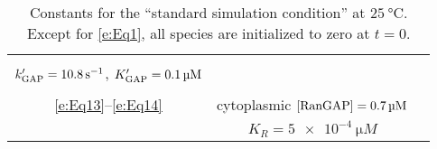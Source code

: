 \documentclass[12pt,notitlepage]{article}
\begin{document}
\begin{table}
\begin{tabular}{c|c|c}
{	}
	&
	\makecell{
		$k_{\ce{GAP}} = \SI{10.6}{s^{-1}}$,
		\quad
		$K_{\ce{GAP}} = \SI{0.7}{\micro M}$
		\\
		$k_{\ce{GAP}}' = \SI{10.8}{s^{-1}}$,
		\quad
		$K_{\ce{GAP}}' = \SI{0.1}{\micro M}$
	}
	&
	\makecell{
		\cite[Supp.~Table~A]{GoerlichSeewaldRibbeck2003}
		\\
		\cite[Table~I]{GoerlichSeewaldRibbeck2003}
	}
	\\
	\hline
	\eqref{e:Eq13}--\eqref{e:Eq14}
	&
	cytoplasmic
	$[\ce{RanGAP}] = \SI{0.7}{\micro M}$
	&
	\cite[Table~II / ST~B]{GoerlichSeewaldRibbeck2003}
	\\
	\hline
	\TODO{\eqref{?}}
	&
	$K_R = \SI{5e-4}{\micro M}$
	&
	\cite[Supp.~Table~A]{GoerlichSeewaldRibbeck2003}
	\\
	\hline
\end{tabular}
%
\caption{%
	Constants
	for the ``standard simulation condition''
	at $\SI{25}{\celsius}$.
	Except for \eqref{e:Eq1},
	all species are initialized to zero at $t = 0$.
}
%
\label{t:GSR-const}
\end{table}
\end{document}
